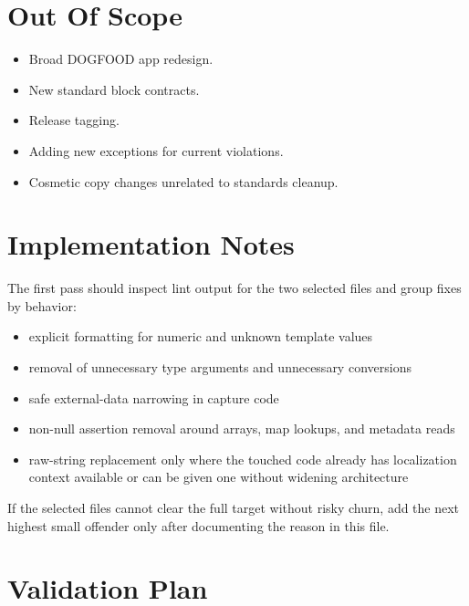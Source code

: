 \section{Out Of Scope}\label{record-199-out-of-scope}

\begin{itemize}
\tightlist
\item
  Broad DOGFOOD app redesign.
\item
  New standard block contracts.
\item
  Release tagging.
\item
  Adding new exceptions for current violations.
\item
  Cosmetic copy changes unrelated to standards cleanup.
\end{itemize}

\section{Implementation Notes}\label{record-199-implementation-notes}

The first pass should inspect lint output for the two selected files and group fixes by behavior:

\begin{itemize}
\tightlist
\item
  explicit formatting for numeric and unknown template values
\item
  removal of unnecessary type arguments and unnecessary conversions
\item
  safe external-data narrowing in capture code
\item
  non-null assertion removal around arrays, map lookups, and metadata reads
\item
  raw-string replacement only where the touched code already has localization context available or can be given one without widening architecture
\end{itemize}

If the selected files cannot clear the full target without risky churn, add the next highest small offender only after documenting the reason in this file.

\section{Validation Plan}\label{record-199-validation-plan}

